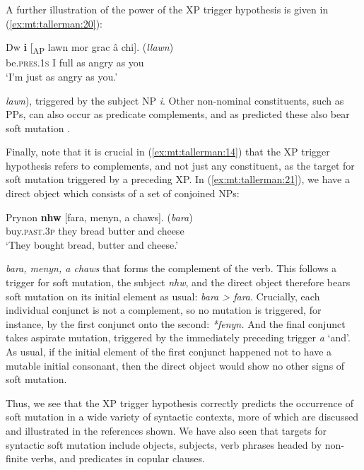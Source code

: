 \documentclass[output=paper,colorlinks,citecolor=brown]{langscibook}
\begin{document}
A further illustration of the power of the XP trigger hypothesis is given in (\ref{ex:mt:tallerman:20}):

\ea\label{ex:mt:tallerman:20}
\gll Dw \textbf{i} [\textsubscript{AP} lawn mor grac â chi]. (\textit{llawn})\\
be.\textsc{pres.1s}  I {} full as angry as you\\
\glt ‘I’m just as angry as you.’
\z

 {\textit{lawn}}{), triggered by the subject NP} {\textit{i}}{. Other non-nominal constituents, such as PPs, can also occur as predicate complements, and as predicted these also bear soft mutation \citep{Tallerman2006}.} 

Finally, note that it is crucial in (\ref{ex:mt:tallerman:14}) that the XP trigger hypothesis refers to complements, and not just any constituent, as the target for soft mutation triggered by a preceding XP. In (\ref{ex:mt:tallerman:21}), we have a direct object which consists of a set of conjoined NPs:


\ea\label{ex:mt:tallerman:21}
\gll Prynon \textbf{nhw} [fara, menyn, a chaws].   (\textit{bara})\\
buy.\textsc{past.3p} they bread butter and cheese\\
\glt  ‘They bought bread, butter and cheese.’
\z

 \textit{bara, menyn, a chaws} that forms the complement of the verb. This follows a trigger for soft mutation, the subject {\textit{nhw}}{, and the direct object therefore bears soft mutation on its initial element as usual:} {\textit{bara > fara}}{. Crucially, each individual conjunct is not a complement, so no mutation is triggered, for instance, by the first conjunct onto the second:}{ \textit{*fenyn.} }{And the final conjunct takes aspirate mutation, triggered by the immediately preceding trigger} {\textit{a}}{ ‘and’. As usual, if the initial element of the first conjunct happened not to have a mutable initial consonant, then the direct object would show no other signs of soft mutation.} 

Thus, we see that the XP trigger hypothesis correctly predicts the occurrence of soft mutation in a wide variety of syntactic contexts, more of which are discussed and illustrated in the references shown. We have also seen that targets for syntactic soft mutation include objects, subjects, verb phrases headed by non-finite verbs, and predicates in copular clauses. 
\end{document}

